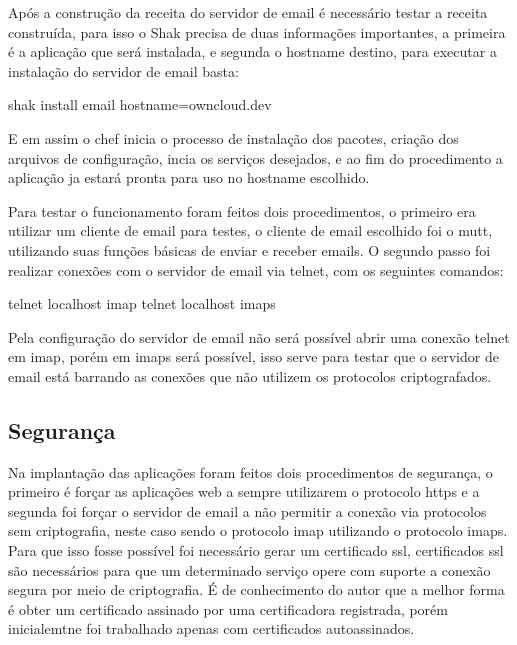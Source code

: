 Após a construção da receita do servidor de email é necessário testar a receita construída,
para isso o Shak precisa de duas informações importantes, a primeira é a aplicação
que será instalada, e segunda o hostname destino, para executar a instalação
do servidor de email basta:

\begin{center}
shak install email hostname=owncloud.dev
\end{center}

E em assim o chef inicia o processo de instalação dos pacotes, criação dos arquivos
de configuração, incia os serviços desejados, e ao fim do procedimento a aplicação
ja estará pronta para uso no hostname escolhido.

Para testar o funcionamento foram feitos dois procedimentos, o primeiro era utilizar
um cliente de email para testes, o cliente de email escolhido foi o mutt, utilizando
suas funções básicas de enviar e receber emails. O segundo passo foi realizar conexões
com o servidor de email via telnet, com os seguintes comandos:

\begin{center}
  telnet localhost imap
  telnet localhost imaps
\end{center}

Pela configuração do servidor de email não será possível abrir uma conexão telnet
em imap, porém em imaps será possível, isso serve para testar que o servidor de email
está barrando as conexões que não utilizem os protocolos criptografados.




\subsection{Segurança}
\label{sub:prototipo}

Na implantação das aplicações foram feitos dois procedimentos de segurança, o primeiro
é forçar as aplicações web a sempre utilizarem o protocolo https e a segunda foi forçar o
servidor de email a não permitir a conexão via protocolos sem criptografia, neste
caso sendo o protocolo imap utilizando o protocolo imaps. Para que isso fosse possível
foi necessário gerar um certificado ssl, certificados ssl são necessários para
que um determinado serviço opere com suporte a conexão segura por meio de criptografia.
É de conhecimento do autor que a melhor forma é obter um certificado assinado
por uma certificadora registrada, porém inicialemtne foi trabalhado apenas com certificados
autoassinados.

